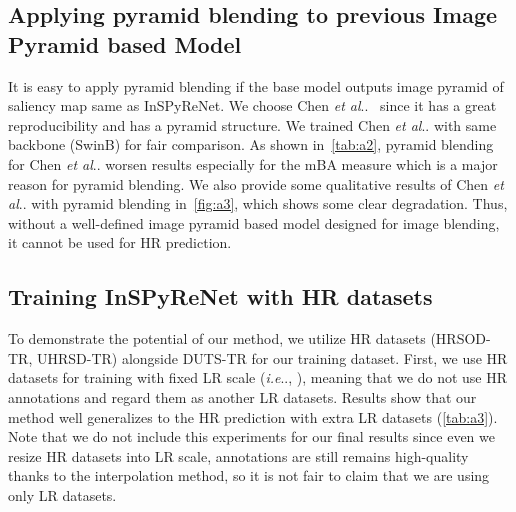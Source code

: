\documentclass{llncs}
\makeatletter
\DeclareRobustCommand\onedot{\futurelet\@let@token\@onedot}
\def\@onedot{\ifx\@let@token.\else.\null\fi\xspace}
\def\ie{\emph{i.e}\onedot} \def\Ie{\emph{I.e}\onedot}
\def\etal{\emph{et al}\onedot}
\makeatother
\begin{document}
\subsection{Applying pyramid blending to previous Image Pyramid based Model}
It is easy to apply pyramid blending if the base model outputs image pyramid of saliency map same as InSPyReNet.
We choose Chen \etal~\cite{chen2018reverse} since it has a great reproducibility and has a pyramid structure.
We trained Chen \etal with same backbone (SwinB) for fair comparison.
As shown in~\cref{tab:a2}, pyramid blending for Chen \etal worsen results especially for the mBA measure which is a major reason for pyramid blending.
We also provide some qualitative results of Chen \etal with pyramid blending in~\cref{fig:a3}, which shows some clear degradation.
Thus, without a well-defined image pyramid based model designed for image blending, it cannot be used for HR prediction.


\subsection{Training InSPyReNet with HR datasets}
To demonstrate the potential of our method, we utilize HR datasets (HRSOD-TR, UHRSD-TR) alongside DUTS-TR for our training dataset. 
First, we use HR datasets for training with fixed LR scale (\ie, ), meaning that we do not use HR annotations and regard them as another LR datasets.
Results show that our method well generalizes to the HR prediction with extra LR datasets (\cref{tab:a3}).
Note that we do not include this experiments for our final results since even we resize HR datasets into LR scale, 
annotations are still remains high-quality thanks to the interpolation method, so it is not fair to claim that we are using only LR datasets.
\end{document}
